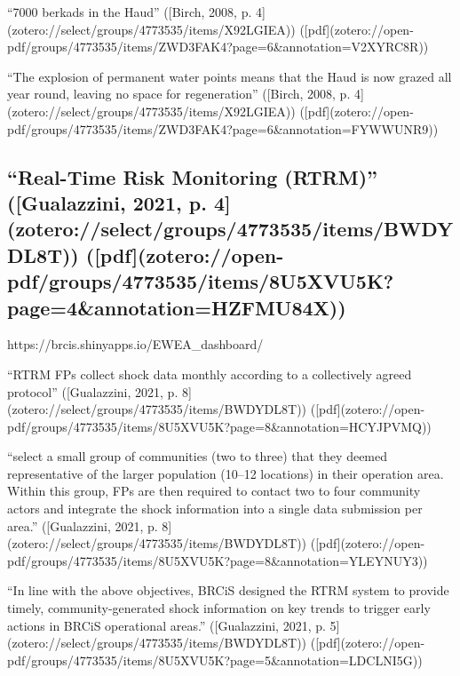 {{“7000 berkads in the Haud” ([Birch, 2008, p. 4](zotero://select/groups/4773535/items/X92LGIEA)) ([pdf](zotero://open-pdf/groups/4773535/items/ZWD3FAK4?page=6&annotation=V2XYRC8R))

“The explosion of permanent water points means that the Haud is now grazed all year round, leaving no space for regeneration” ([Birch, 2008, p. 4](zotero://select/groups/4773535/items/X92LGIEA)) ([pdf](zotero://open-pdf/groups/4773535/items/ZWD3FAK4?page=6&annotation=FYWWUNR9))




\subsection{“Real-Time Risk Monitoring (RTRM)” ([Gualazzini, 2021, p. 4](zotero://select/groups/4773535/items/BWDYDL8T)) ([pdf](zotero://open-pdf/groups/4773535/items/8U5XVU5K?page=4&annotation=HZFMU84X))} %

https://brcis.shinyapps.io/EWEA_dashboard/

“RTRM FPs collect shock data monthly according to a collectively agreed protocol” ([Gualazzini, 2021, p. 8](zotero://select/groups/4773535/items/BWDYDL8T)) ([pdf](zotero://open-pdf/groups/4773535/items/8U5XVU5K?page=8&annotation=HCYJPVMQ))

“select a small group of communities (two to three) that they deemed representative of the larger population (10–12 locations) in their operation area. Within this group, FPs are then required to contact two to four community actors and integrate the shock information into a single data submission per area.” ([Gualazzini, 2021, p. 8](zotero://select/groups/4773535/items/BWDYDL8T)) ([pdf](zotero://open-pdf/groups/4773535/items/8U5XVU5K?page=8&annotation=YLEYNUY3))

“In line with the above objectives, BRCiS designed the RTRM system to provide timely, community-generated shock information on key trends to trigger early actions in BRCiS operational areas.” ([Gualazzini, 2021, p. 5](zotero://select/groups/4773535/items/BWDYDL8T)) ([pdf](zotero://open-pdf/groups/4773535/items/8U5XVU5K?page=5&annotation=LDCLNI5G))

}}
